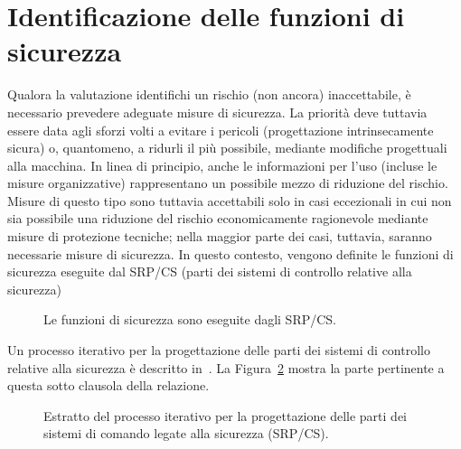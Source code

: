 \section{Identificazione delle funzioni di sicurezza}
\label{sec:05-3}
Qualora la valutazione identifichi un rischio (non ancora) inaccettabile, è necessario prevedere adeguate misure di sicurezza. La priorità deve tuttavia essere data agli sforzi volti a evitare i pericoli (progettazione intrinsecamente sicura) o, quantomeno, a ridurli il più possibile, mediante modifiche progettuali alla macchina. In linea di principio, anche le informazioni per l'uso (incluse le misure organizzative) rappresentano un possibile mezzo di riduzione del rischio. Misure di questo tipo sono tuttavia accettabili solo in casi eccezionali in cui non sia possibile una riduzione del rischio economicamente ragionevole mediante misure di protezione tecniche; nella maggior parte dei casi, tuttavia, saranno necessarie misure di sicurezza. In questo contesto, vengono definite le funzioni di sicurezza eseguite dal SRP/CS (parti dei sistemi di controllo relative alla sicurezza)
\begin{figure}[htbp]
    \centering
    \resizebox{0.8\textwidth}{!}{}
    \caption{Le funzioni di sicurezza sono eseguite dagli SRP/CS.}
    \label{fig:05-04}
\end{figure}
Un processo iterativo per la progettazione delle parti dei sistemi di controllo relative alla sicurezza è descritto in~\cite{eniso13849-1}. La Figura~\ref{fig:05-05} mostra la parte pertinente a questa sotto clausola della relazione.
\begin{figure}[htbp]
    \centering
    \resizebox{\textwidth}{!}{}
    \caption{Estratto del processo iterativo per la progettazione delle parti dei sistemi di comando legate alla sicurezza (SRP/CS).}
    \label{fig:05-05}
\end{figure}

